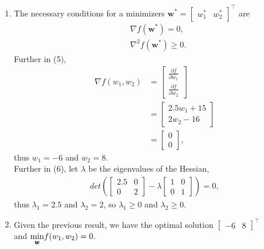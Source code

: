 \documentclass[10pt]{article}
\begin{document}
\begin{enumerate}[1)]
\item
The necessary conditions for a minimizers $\pmb{w}^*=
  \begin{bmatrix}
    w_1^* & w_2^*
  \end{bmatrix}^\top$ are
\begin{align}
&\nabla f(\pmb{w}^*)=0,\\
&\nabla^2f(\pmb{w}^*)\geq0.
\end{align}
Further in (5),
\begin{align}
\nabla f(w_1,w_2)&=
  \begin{bmatrix}
    \frac{\partial f}{\partial w_1}\\
    \frac{\partial f}{\partial w_2}
  \end{bmatrix}\\
&=
  \begin{bmatrix}
    2.5w_1+15\\
    2w_2-16
  \end{bmatrix}\\
&=
  \begin{bmatrix}
    0\\
    0
  \end{bmatrix},
\end{align}
thus $w_1=-6$ and $w_2=8$.\\
Further in (6), let $\lambda$ be the eigenvalues of the Hessian,
\begin{align}
det(
  \begin{bmatrix}
    2.5 & 0\\
    0 & 2
  \end{bmatrix}
-\lambda
  \begin{bmatrix}
    1 & 0\\
    0 & 1
  \end{bmatrix}
)=0,
\end{align}
thus $\lambda_1=2.5$ and $\lambda_2=2$, so $\lambda_1\geq0$ and $\lambda_2\geq0$.\\

\item
Given the previous result, we have the optimal solution $
  \begin{bmatrix}
    -6 & 8
  \end{bmatrix}^\top$\\
and $\smash{\displaystyle\min_{\pmb{w}}}f(w_1,w_2)=0$.\\


\end{enumerate}
\end{document}
